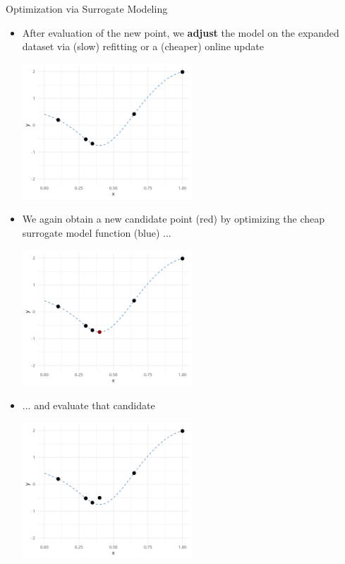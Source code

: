 \documentclass[11pt,compress,t,notes=noshow, xcolor=table]{beamer}
\begin{document}
\begin{vbframe}{Optimization via Surrogate Modeling}
\framebreak 

\begin{itemize}

\item After evaluation of the new point, we \textbf{adjust} the model on the expanded dataset via (slow) refitting or a (cheaper) online update
\vspace{+.45cm}

\begin{center}
  \includegraphics[width = 0.5\textwidth]{figure_man/loop_4.png}
\end{center}

\framebreak 

\item We again obtain a new candidate point (red) by optimizing the cheap surrogate model function (blue) ...
\vspace{+.45cm}

\begin{center}
  \includegraphics[width = 0.5\textwidth]{figure_man/loop_5.png}
\end{center}

\framebreak

\item ... and evaluate that candidate
\vspace{+.45cm}

\begin{center}
  \includegraphics[width = 0.5\textwidth]{figure_man/loop_6.png}
\end{center}


\end{itemize}
\end{vbframe}
\end{document}
